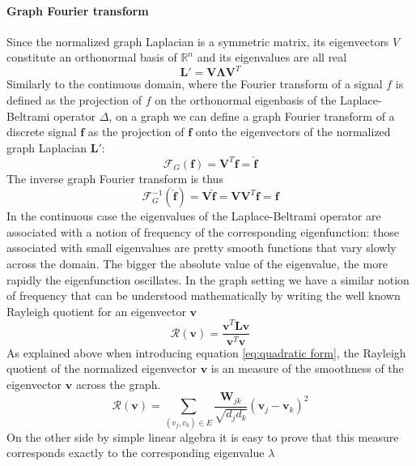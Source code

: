 \paragraph{Graph Fourier transform}
Since the normalized graph Laplacian is a symmetric matrix, its eigenvectors $V$ constitute an orthonormal basis of $\mathbb R^n$ and its eigenvalues are all real 
$$\mathbf L' = \mathbf V\mathbf \Lambda\mathbf V^T
$$
Similarly to the continuous domain, where the Fourier transform of a signal $f$ is defined as the projection of $f$ on the orthonormal eigenbasis of the Laplace-Beltrami operator $\Delta$, on a graph we can define a graph Fourier transform of a discrete signal $\mathbf f$ as the projection of $\mathbf f$ onto the eigenvectors of the normalized graph Laplacian $\mathbf L'$:
\begin{equation}\label{eq:graph fourier}
\mathcal F_G(\mathbf f) = \mathbf V^T\mathbf f = \hat{\mathbf f}
\end{equation}
The inverse graph Fourier transform is thus 
\begin{equation}\label{eq:graph fourier inverse}
\mathcal F^{-1}_G(\hat{\mathbf f}) = \mathbf V \hat{\mathbf f} = \mathbf V\mathbf V^T\mathbf f = {\mathbf f}
\end{equation}
In the continuous case the eigenvalues of the Laplace-Beltrami operator are associated with a notion of frequency of the corresponding eigenfunction: those associated with small eigenvalues are pretty smooth functions that vary slowly across the domain. The bigger the absolute value of the eigenvalue, the more rapidly the eigenfunction oscillates. In the graph setting we have a similar notion of frequency that can be understood mathematically by writing the well known Rayleigh quotient for an eigenvector $\mathbf v$
\begin{equation}
	\mathcal R(\mathbf v) = \frac{\mathbf v^T\mathbf L\mathbf v}{\mathbf v^T\mathbf v}
\end{equation}
As explained above when introducing equation \ref{eq:quadratic form}, the Rayleigh quotient of the normalized eigenvector $\mathbf v$ is an measure of the smoothness of the eigenvector $\mathbf v$ across the graph. 
\begin{equation}\label{eq:r(v)}
	\mathcal R(\mathbf v) = \sum_{\left(v_{j}, v_{k}\right) \in {E}} \frac{\boldsymbol{W}_{j k}}{\sqrt{d_{j} 	{d}_{k}}}\left(\boldsymbol{v}_{j}-\boldsymbol{v}_{k}\right)^{2}
\end{equation}
On the other side by simple linear algebra it is easy to prove that this measure corresponds exactly to the corresponding eigenvalue $\lambda$
